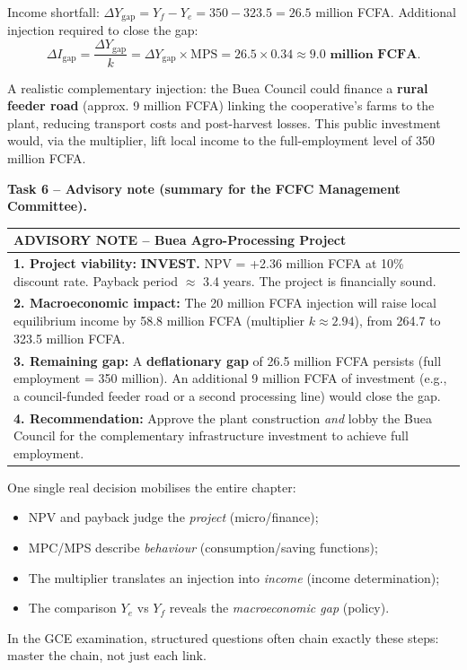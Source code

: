 \documentclass[11pt]{article}
\begin{document}
Income shortfall: $\Delta Y_{\text{gap}} = Y_f - Y_e = 350 - 323.5 = 26.5$ million FCFA.
Additional injection required to close the gap:
\[
\Delta I_{\text{gap}} = \frac{\Delta Y_{\text{gap}}}{k} = \Delta Y_{\text{gap}} \times \text{MPS} = 26.5 \times 0.34 \approx \mathbf{9.0 \text{ million FCFA}}.
\]

\begin{savaistu}
A realistic complementary injection: the Buea Council could finance a \textbf{rural feeder road} (approx. 9 million FCFA) linking the cooperative's farms to the plant, reducing transport costs and post-harvest losses. This public investment would, via the multiplier, lift local income to the full-employment level of 350 million FCFA.
\end{savaistu}

\textbf{Task 6 -- Advisory note (summary for the FCFC Management Committee).}

\begin{center}
\begin{tabularx}{\linewidth}{|X|}
\hline
\rowcolor{popblueL} \textbf{ADVISORY NOTE -- Buea Agro-Processing Project} \\
\hline
\textbf{1. Project viability:} \textbf{INVEST.} NPV = +2.36 million FCFA at 10\% discount rate. Payback period $\approx$ 3.4 years. The project is financially sound. \\
\textbf{2. Macroeconomic impact:} The 20 million FCFA injection will raise local equilibrium income by 58.8 million FCFA (multiplier $k \approx 2.94$), from 264.7 to 323.5 million FCFA. \\
\textbf{3. Remaining gap:} A \textbf{deflationary gap} of 26.5 million FCFA persists (full employment = 350 million). An additional 9 million FCFA of investment (e.g., a council-funded feeder road or a second processing line) would close the gap. \\
\textbf{4. Recommendation:} Approve the plant construction \emph{and} lobby the Buea Council for the complementary infrastructure investment to achieve full employment. \\
\hline
\end{tabularx}
\end{center}

\begin{aretenir}
One single real decision mobilises the entire chapter:
\begin{itemize}
\item NPV and payback judge the \emph{project} (micro/finance);
\item MPC/MPS describe \emph{behaviour} (consumption/saving functions);
\item The multiplier translates an injection into \emph{income} (income determination);
\item The comparison $Y_e$ vs $Y_f$ reveals the \emph{macroeconomic gap} (policy).
\end{itemize}
In the GCE examination, structured questions often chain exactly these steps: master the chain, not just each link.
\end{aretenir}
\end{document}
